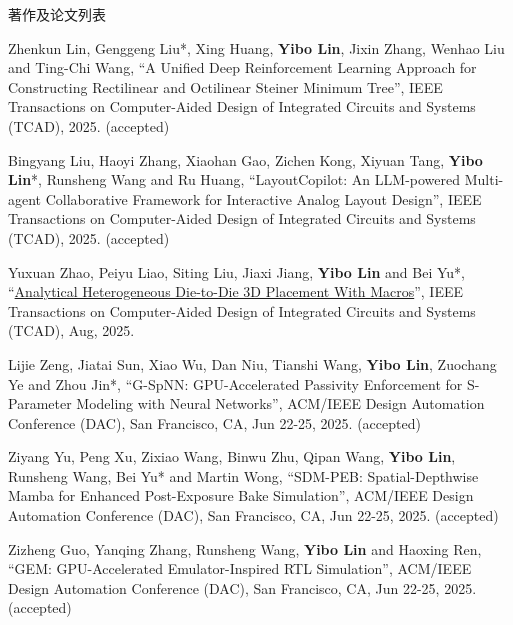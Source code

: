 \begin{rSection}{著作及论文列表}
\begin{description}[font=\normalfont, rightmargin=2em]
\item[{[J182]}]{
        Zhenkun Lin, Genggeng Liu*, Xing Huang, \textbf{Yibo Lin}, Jixin Zhang, Wenhao Liu and Ting-Chi Wang, 
    ``A Unified Deep Reinforcement Learning Approach for Constructing Rectilinear and Octilinear Steiner Minimum Tree'', 
    IEEE Transactions on Computer-Aided Design of Integrated Circuits and Systems (TCAD), 2025.
    (accepted)
}
            

\item[{[J181]}]{
        Bingyang Liu, Haoyi Zhang, Xiaohan Gao, Zichen Kong, Xiyuan Tang, \textbf{Yibo Lin}*, Runsheng Wang and Ru Huang, 
    ``LayoutCopilot: An LLM-powered Multi-agent Collaborative Framework for Interactive Analog Layout Design'', 
    IEEE Transactions on Computer-Aided Design of Integrated Circuits and Systems (TCAD), 2025.
    (accepted)
}
            

\item[{[J180]}]{
        Yuxuan Zhao, Peiyu Liao, Siting Liu, Jiaxi Jiang, \textbf{Yibo Lin} and Bei Yu*, 
    ``\href{https://doi.org/10.1109/TCAD.2024.3444716}{Analytical Heterogeneous Die-to-Die 3D Placement With Macros}'', 
    IEEE Transactions on Computer-Aided Design of Integrated Circuits and Systems (TCAD), Aug, 2025.
    
}
            

\item[{[C179]}]{
        Lijie Zeng, Jiatai Sun, Xiao Wu, Dan Niu, Tianshi Wang, \textbf{Yibo Lin}, Zuochang Ye and Zhou Jin*, 
    ``G-SpNN: GPU-Accelerated Passivity Enforcement for S-Parameter Modeling with Neural Networks'', 
    ACM/IEEE Design Automation Conference (DAC), San Francisco, CA, Jun 22-25, 2025.
    (accepted)
}
            

\item[{[C178]}]{
        Ziyang Yu, Peng Xu, Zixiao Wang, Binwu Zhu, Qipan Wang, \textbf{Yibo Lin}, Runsheng Wang, Bei Yu* and Martin Wong, 
    ``SDM-PEB: Spatial-Depthwise Mamba for Enhanced Post-Exposure Bake Simulation'', 
    ACM/IEEE Design Automation Conference (DAC), San Francisco, CA, Jun 22-25, 2025.
    (accepted)
}
            

\item[{[C177]}]{
        Zizheng Guo, Yanqing Zhang, Runsheng Wang, \textbf{Yibo Lin} and Haoxing Ren, 
    ``GEM: GPU-Accelerated Emulator-Inspired RTL Simulation'', 
    ACM/IEEE Design Automation Conference (DAC), San Francisco, CA, Jun 22-25, 2025.
    (accepted)
}
            


\end{description}
\end{rSection}
